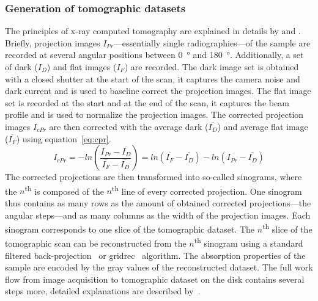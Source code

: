 \subsubsection{Generation of tomographic datasets}
The principles of x-ray computed tomography are explained in details by \citet{Kak2002} and \citet{Hsieh2003}. Briefly, projection images \(I_{Pr}\)---essentially single radiographies---of the sample are recorded at several angular positions between \SI{0}{\degree} and \SI{180}{\degree}. Additionally, a set of dark (\(I_{D}\)) and flat images (\(I_{F}\)) are recorded. The dark image set is obtained with a closed shutter at the start of the scan, it captures the camera noise and dark current and is used to baseline correct the projection images. The flat image set is recorded at the start and at the end of the scan, it captures the beam profile and is used to normalize the projection images. The corrected projection images \(I_{cPr}\) are then corrected with the average dark (\(\overline{I_{D}}\)) and average flat image (\(\overline{I_{F}}\)) using equation~\ref{eq:cpr}.
\begin{equation}
	I_{cPr} = -ln\left(\frac{I_{Pr}-\overline{I_{D}}}{\overline{I_{F}}-\overline{I_{D}}}\right)
	        = ln(\overline{I_{F}}-\overline{I_{D}})-ln(I_{Pr}-\overline{I_{D}})
	\label{eq:cpr}
\end{equation}
The corrected projections are then transformed into so-called sinograms, where the $n$\textsuperscript{th} is composed of the $n$\textsuperscript{th} line of every corrected projection. One sinogram thus contains as many rows as the amount of obtained corrected projections---the angular steps---and as many columns as the width of the projection images. Each sinogram corresponds to one slice of the tomographic dataset. The $n$\textsuperscript{th} slice of the tomographic scan can be reconstructed from the $n$\textsuperscript{th} sinogram using a standard filtered back-projection~\cite{Kak2002,Hsieh2003} or gridrec~\cite{Dowd1999} algorithm. The absorption properties of the sample are encoded by the gray values of the reconstructed dataset. The full work flow from image acquisition to tomographic dataset on the disk contains several steps more, detailed explanations are described by~\citet{Hintermueller2009}.

